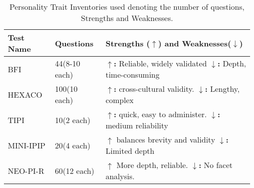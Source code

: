 \begin{table}[h!]
\centering
\caption{Personality Trait Inventories used  denoting the number of questions, Strengths and Weaknesses.}
\small
\begin{tabular}{@{}llp{4.5cm}@{}}
\toprule
\textbf{Test Name} &  \textbf{Questions }& \textbf{Strengths ($\uparrow$) and Weaknesses($\downarrow$)} \\
\midrule
BFI\cite{thebfi} & 44(8-10 each) & \textbf{$\uparrow$:} Reliable, widely validated \newline \textbf{$\downarrow$:} Depth, time-consuming \\
\hline
HEXACO\cite{hexaco} & 100(10 each) & \textbf{$\uparrow$:} cross-cultural validity. \newline \textbf{$\downarrow$:} Lengthy, complex  \\
\hline
TIPI\cite{tipi} & 10(2 each) & \textbf{$\uparrow$:}  quick, easy to administer. \newline \textbf{$\downarrow$:} medium reliability \\
\hline
MINI-IPIP\cite{miniipip} & 20(4 each) & \textbf{$\uparrow$}  balances brevity and validity \newline \textbf{$\downarrow$:} Limited depth \\
\hline
NEO-PI-R\cite{ipipneo60} & 60(12 each) & \textbf{$\uparrow$} More depth, reliable. \newline \textbf{$\downarrow$:} No facet analysis. \\
\bottomrule
\end{tabular}
\label{tab:personality_tests}
\end{table}